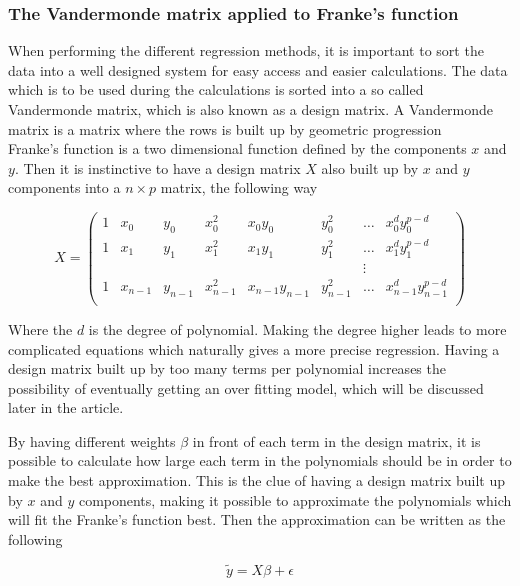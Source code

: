 \subsubsection{The Vandermonde matrix applied to Franke's function}


When performing the different regression methods, it is important to sort the data into a well designed system for easy access and easier calculations. The data which is to be used during the calculations is sorted into a so called Vandermonde matrix, which is also known as a design matrix. A Vandermonde matrix is a matrix where the rows is built up by geometric progression \\%

Franke's function is a two dimensional function defined by the components $x$ and $y$. Then it is instinctive to have a design matrix $X$ also built up by $x$ and $y$ components into a $n\times p$ matrix, the following way

\begin{equation*}
X=  \begin{pmatrix}
   1& x_0 & y_0 & x_0^2 & x_0y_0 & y_0^2 & \ldots & x_0^d y_0^{p-d}\\
    1& x_1 & y_1 & x_1^2 & x_1y_1 & y_1^2 & \ldots & x_1^d y_1^{p-d}\\
    & &  &  &  &  & \vdots & \\
    1 & x_{n-1} & y_{n-1} & x_{n-1}^2 & x_{n-1}y_{n-1} & y_{n-1}^2 & \ldots & x_{n-1}^d y_{n-1}^{p-d}\\
 \end{pmatrix}
\end{equation*}

Where the $d$ is the degree of polynomial. Making the degree higher leads to more complicated equations which naturally gives a more precise regression. Having a design matrix built up by too many terms per polynomial increases the possibility of eventually getting an over fitting model, which will be discussed later in the article.

By having different weights $\beta$ in front of each term in the design matrix, it is possible to calculate how large each term in the polynomials should be in order to make the best approximation. This is the clue of having a design matrix built up by $x$ and $y$ components, making it possible to approximate the polynomials which will fit the Franke's function best. Then the approximation can be written as the following

\begin{equation}
    \tilde{y}=X\beta+\epsilon
\end{equation}

